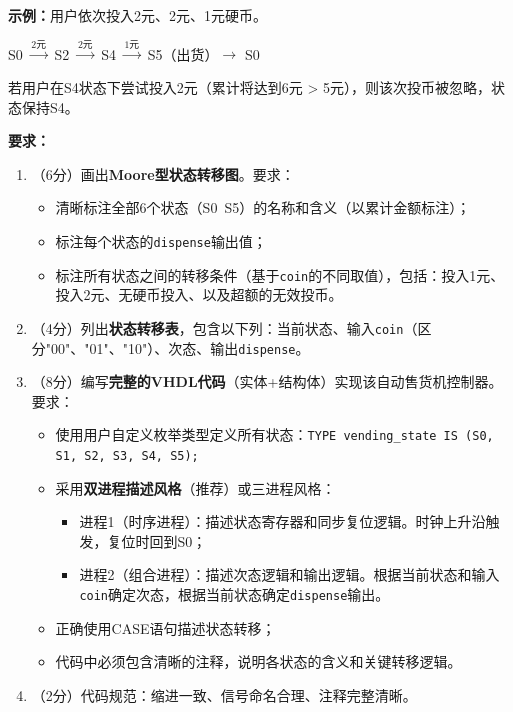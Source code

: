 \textbf{示例：}用户依次投入2元、2元、1元硬币。
\begin{center}
S0 $\xrightarrow{\text{2元}}$ S2 $\xrightarrow{\text{2元}}$ S4 $\xrightarrow{\text{1元}}$ S5（出货）$\to$ S0
\end{center}
若用户在S4状态下尝试投入2元（累计将达到6元 > 5元），则该次投币被忽略，状态保持S4。

\textbf{要求：}
\begin{enumerate}[label=(\arabic*)]
  \item （6分）画出\textbf{Moore型状态转移图}。要求：
  \begin{itemize}
    \item 清晰标注全部6个状态（S0~S5）的名称和含义（以累计金额标注）；
    \item 标注每个状态的\texttt{dispense}输出值；
    \item 标注所有状态之间的转移条件（基于\texttt{coin}的不同取值），包括：投入1元、投入2元、无硬币投入、以及超额的无效投币。
  \end{itemize}
  \item （4分）列出\textbf{状态转移表}，包含以下列：当前状态、输入\texttt{coin}（区分"00"、"01"、"10"）、次态、输出\texttt{dispense}。
  \item （8分）编写\textbf{完整的VHDL代码}（实体+结构体）实现该自动售货机控制器。要求：
  \begin{itemize}
    \item 使用用户自定义枚举类型定义所有状态：\texttt{TYPE vending\_state IS (S0, S1, S2, S3, S4, S5);}
    \item 采用\textbf{双进程描述风格}（推荐）或三进程风格：
    \begin{itemize}
      \item 进程1（时序进程）：描述状态寄存器和同步复位逻辑。时钟上升沿触发，复位时回到S0；
      \item 进程2（组合进程）：描述次态逻辑和输出逻辑。根据当前状态和输入\texttt{coin}确定次态，根据当前状态确定\texttt{dispense}输出。
    \end{itemize}
    \item 正确使用CASE语句描述状态转移；
    \item 代码中必须包含清晰的注释，说明各状态的含义和关键转移逻辑。
  \end{itemize}
  \item （2分）代码规范：缩进一致、信号命名合理、注释完整清晰。
\end{enumerate}

